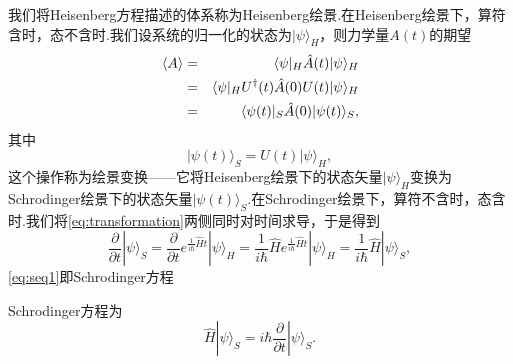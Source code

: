 			我们将Heisenberg方程描述的体系称为Heisenberg绘景.在Heisenberg绘景下，算符含时，态不含时.我们设系统的归一化的状态为$\vert\psi\rangle_H$，则力学量$A(t)$的期望
			\begin{eqnarray}
				\langle A\rangle&=&\langle\psi\vert_H\hat{A}(t)\vert\psi\rangle_H\notag\\
				&=&\langle\psi\vert_H U^\dagger(t)\hat{A}(0)U(t)\vert\psi\rangle_H\notag\\
				&=&\langle\psi(t)\vert_S\hat{A}(0)\vert\psi(t)\rangle_S,
			\end{eqnarray}
			其中
			\begin{equation}\label{eq:transformation}
				\vert\psi(t)\rangle_S=U(t)\vert\psi\rangle_H,
			\end{equation}
			这个操作称为绘景变换——它将Heisenberg绘景下的状态矢量$\vert\psi\rangle_H$变换为Schrodinger绘景下的状态矢量$\vert\psi(t)\rangle_S$.在Schrodinger绘景下，算符不含时，态含时.我们将\ref{eq:transformation}两侧同时对时间求导，于是得到
			\begin{equation}\label{eq:seq1}
				\frac{\partial}{\partial t}|\psi\rangle_{S}=\frac{\partial}{\partial t} e^{\frac{1}{i \hbar} \hat{H} t}|\psi\rangle_{H}=\frac{1}{i \hbar} \hat{H} e^{\frac{1}{i \hbar} \hat{H} t}|\psi\rangle_{H}=\frac{1}{i\hbar} \hat{H}|\psi\rangle_{S},
			\end{equation}
			\ref{eq:seq1}即Schrodinger方程
			\begin{definition}Schrodinger方程为
				\begin{equation}\label{eq:seq2}
					\hat{H}|\psi\rangle_{S}=i\hbar\frac{\partial}{\partial t}|\psi\rangle_{S}.
				\end{equation}
			\end{definition}


\newpage